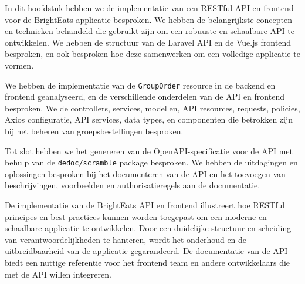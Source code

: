 In dit hoofdstuk hebben we de implementatie van een RESTful API en frontend voor de Bright\-Eats applicatie besproken. We hebben de belangrijkste concepten en technieken behandeld die gebruikt zijn om een robuuste en schaalbare API te ontwikkelen. We hebben de structuur van de Laravel API en de Vue.js frontend besproken, en ook besproken hoe deze samenwerken om een volledige applicatie te vormen.

\bigskip

We hebben de implementatie van de \texttt{GroupOrder} resource in de backend en frontend geanalyseerd, en de verschillende onderdelen van de API en frontend besproken. We de controllers, services, modellen, API resources, requests, policies, Axios configuratie, API services, data types, en componenten die betrokken zijn bij het beheren van groepsbestellingen besproken.

\bigskip

Tot slot hebben we het genereren van de OpenAPI-specificatie voor de API met behulp van de \texttt{dedoc/scramble} package besproken. We hebben de uitdagingen en oplossingen besproken bij het documenteren van de API en het toevoegen van beschrijvingen, voorbeelden en authorisatieregels aan de documentatie.

\bigskip

De implementatie van de Bright\-Eats API en frontend illustreert hoe RESTful principes en best practices kunnen worden toegepast om een moderne en schaalbare applicatie te ontwikkelen. Door een duidelijke structuur en scheiding van verantwoordelijkheden te hanteren, wordt het onderhoud en de uitbreidbaarheid van de applicatie gegarandeerd. De documentatie van de API biedt een nuttige referentie voor het frontend team en andere ontwikkelaars die met de API willen integreren.
